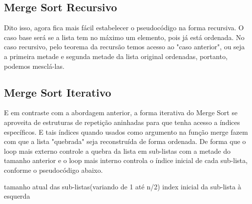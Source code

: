 \FloatBarrier

\newpage

\subsection{Merge Sort Recursivo}

Dito isso, agora fica mais fácil estabelecer o pseudocódigo na forma recursiva. O caso base será se a lista tem no máximo um elemento, pois já está ordenada. No caso recursivo, pelo teorema da recursão temos acesso ao "caso anterior", ou seja a primeira metade e segunda metade da lista original ordenadas, portanto, podemos mesclá-las.

\begin{algorithm}
	\label{algo:merge_sort_pseudo}
	\begin{algorithmic}[1]
		 \Return
		\EndIf
		\State {}
		\EndFunction
	\end{algorithmic}
\end{algorithm}

\FloatBarrier

\subsection{Merge Sort Iterativo}

E em contraste com a abordagem anterior, a forma iterativa do Merge Sort se aproveita de estruturas de repetição aninhadas para que tenha acesso a índices específicos. E tais índices quando usados como argumento na função merge fazem com que a lista "quebrada" seja reconstruída de forma ordenada. De forma que o loop mais externo controle a quebra da lista em sub-listas com a metade do tamanho anterior e o loop mais interno controla o índice inicial de cada sub-lista, conforme o pseudocódigo abaixo.

\begin{algorithm}
	\label{algo:merge_sort_it_pseudo}
	\begin{algorithmic}[1]
		\Comment tamanho atual das sub-listas(variando de 1 até n/2)
		\Comment index inicial da sub-lista à esquerda


		\EndFor
		\EndFor
		\EndFunction
	\end{algorithmic}
\end{algorithm}


